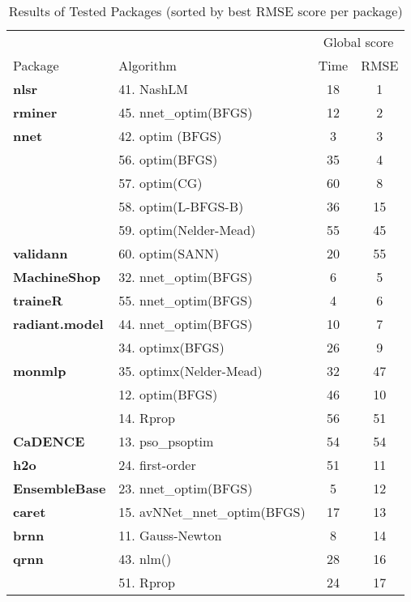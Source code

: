 \begin{table}

\caption{\label{tab:RMSEscore}Results of Tested Packages (sorted by best RMSE score per package)}
\fontsize{7}{9}\selectfont
\begin{tabular}[t]{>{}llcc}
\toprule
\multicolumn{2}{c}{ } & \multicolumn{2}{c}{Global score} \\
\cmidrule(l{3pt}r{3pt}){3-4}
Package & Algorithm & Time & RMSE\\
\midrule
\textbf{nlsr} & 41. NashLM & 18 & 1\\
\cmidrule{1-4}
\textbf{rminer} & 45. nnet\_optim(BFGS) & 12 & 2\\
\cmidrule{1-4}
\textbf{nnet} & 42. optim (BFGS) & 3 & 3\\
\cmidrule{1-4}
 & 56. optim(BFGS) & 35 & 4\\

 & 57. optim(CG) & 60 & 8\\

 & 58. optim(L-BFGS-B) & 36 & 15\\

 & 59. optim(Nelder-Mead) & 55 & 45\\

\multirow{-5}{*}{\raggedright\arraybackslash \textbf{validann}} & 60. optim(SANN) & 20 & 55\\
\cmidrule{1-4}
\textbf{MachineShop} & 32. nnet\_optim(BFGS) & 6 & 5\\
\cmidrule{1-4}
\textbf{traineR} & 55. nnet\_optim(BFGS) & 4 & 6\\
\cmidrule{1-4}
\textbf{radiant.model} & 44. nnet\_optim(BFGS) & 10 & 7\\
\cmidrule{1-4}
 & 34. optimx(BFGS) & 26 & 9\\

\multirow{-2}{*}{\raggedright\arraybackslash \textbf{monmlp}} & 35. optimx(Nelder-Mead) & 32 & 47\\
\cmidrule{1-4}
 & 12. optim(BFGS) & 46 & 10\\

 & 14. Rprop & 56 & 51\\

\multirow{-3}{*}{\raggedright\arraybackslash \textbf{CaDENCE}} & 13. pso\_psoptim & 54 & 54\\
\cmidrule{1-4}
\textbf{h2o} & 24. first-order & 51 & 11\\
\cmidrule{1-4}
\textbf{EnsembleBase} & 23. nnet\_optim(BFGS) & 5 & 12\\
\cmidrule{1-4}
\textbf{caret} & 15. avNNet\_nnet\_optim(BFGS) & 17 & 13\\
\cmidrule{1-4}
\textbf{brnn} & 11. Gauss-Newton & 8 & 14\\
\cmidrule{1-4}
\textbf{qrnn} & 43. nlm() & 28 & 16\\
\cmidrule{1-4}
 & 51. Rprop & 24 & 17\\


\end{tabular}
\end{table}
